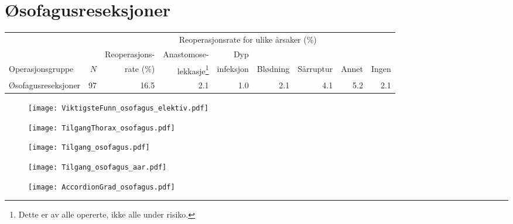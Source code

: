 \documentclass[norsk,a4paper]{article}\usepackage[]{graphicx}\usepackage[]{color}
\begin{document}
\clearpage

\section{Øsofagusreseksjoner}

\begin{table}[htb]
\begin{minipage}{\textwidth}
\centering
\begin{tabular}{lrrrrrrrr}
  \toprule
  & & & \multicolumn{4}{c}{Reoperasjonsrate for ulike årsaker (\%)} \\
 \cline{4-9} 
 & & Reoperasjons- & Anastomose- & Dyp &&&&  \\
 Operasjonsgruppe & $N$ & rate (\%) & lekkasje\footnote[2]{Dette er av alle opererte, ikke
alle under risiko.} & infeksjon & Blødning & Sårruptur & Annet & Ingen \\
 \midrule
Øsofagusreseksjoner & 97 & 16.5 & 2.1 & 1.0 & 2.1 & 4.1 & 5.2 & 2.1 \\ 
   \bottomrule
\end{tabular}

\end{minipage}
\end{table}




\begin{figure}[ht]
\centering
\texttt{[image: ViktigsteFunn\_osofagus\_elektiv.pdf]}
\caption{}
\end{figure}

\begin{figure}[ht]
\centering
\texttt{[image: TilgangThorax\_osofagus.pdf]}
\caption{}
\end{figure}

\begin{figure}[ht]
\centering
\texttt{[image: Tilgang\_osofagus.pdf]}
\caption{}
\end{figure}

\begin{figure}[ht]
\centering
\texttt{[image: Tilgang\_osofagus\_aar.pdf]}
\caption{}
\end{figure}

\begin{figure}[ht]
\centering
\texttt{[image: AccordionGrad\_osofagus.pdf]}
\caption{}
\end{figure}
\end{document}
